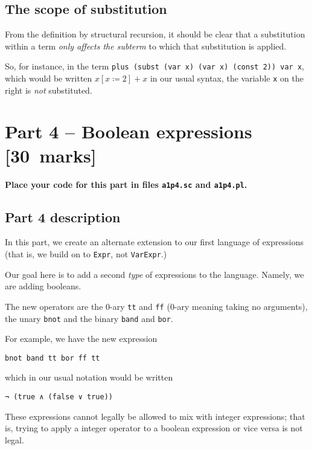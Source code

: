 \documentclass[11pt]{article}
\begin{document}
\subsection*{The scope of substitution}
\label{sec:orgd5ca8f3}
From the definition by structural recursion, it should be clear
that a substitution within a term \emph{only affects the subterm} to which
that substitution is applied.

So, for instance, in the term \texttt{plus (subst (var x) (var x) (const 2)) var x},
which would be written \(x[x ≔ 2] + x\) in our usual syntax,
the variable \texttt{x} on the right is \emph{not} substituted.

\section*{Part 4 – Boolean expressions           [30 marks]}
\label{sec:org8e393a0}
\begin{center}
\textbf{Place your code for this part in files \texttt{a1p4.sc} and \texttt{a1p4.pl}.}
\end{center}

\subsection*{Part 4 description}
\label{sec:orgc8616a3}
In this part, we create an alternate extension to
our first language of expressions
(that is, we build on to \texttt{Expr}, not \texttt{VarExpr}.)

Our goal here is to add
a second \emph{type} of expressions to the language.
Namely, we are adding booleans.

The new operators are
the 0-ary \texttt{tt} and \texttt{ff} (0-ary meaning taking no arguments),
the unary \texttt{bnot} and the binary \texttt{band} and \texttt{bor}.

For example, we have the new expression
\begin{verbatim}
bnot band tt bor ff tt
\end{verbatim}
which in our usual notation would be written
\begin{verbatim}
¬ (true ∧ (false ∨ true))
\end{verbatim}

These expressions cannot legally be allowed to mix
with integer expressions; that is,
trying to apply a integer operator to a boolean expression
or vice versa is not legal.
\end{document}
